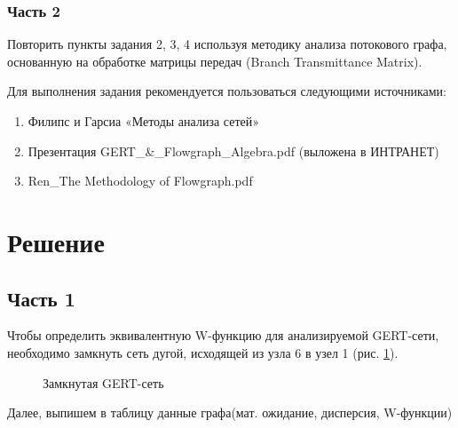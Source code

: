 \subsubsection{Часть 2}
Повторить пункты задания 2, 3, 4 используя методику анализа потокового графа, основанную на обработке матрицы передач (Branch Transmittance Matrix). 


Для выполнения задания рекомендуется пользоваться следующими источниками:
\begin{enumerate}
\item Филипс и Гарсиа «Методы анализа сетей»
\item Презентация GERT\_\&\_Flowgraph\_Algebra.pdf (выложена в ИНТРАНЕТ)
\item Ren\_The Methodology of Flowgraph.pdf
\end{enumerate}

\section{Решение}

\subsection{Часть 1}
Чтобы определить эквивалентную W-функцию для анализируемой GERT-сети, необходимо замкнуть сеть дугой, исходящей из узла 6 в узел 1 (рис. \ref{pic_1}).
\begin{figure}[H]
  \centering
  \caption{Замкнутая GERT-сеть}
  \label{pic_1}
\end{figure}
Далее, выпишем в таблицу данные графа(мат. ожидание, дисперсия, W-функции)

